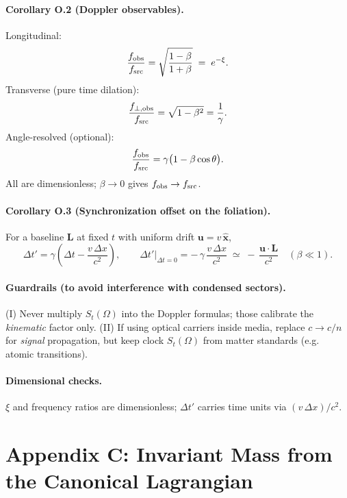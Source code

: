 \documentclass[11pt]{article}
\begin{document}
		\paragraph{Corollary O.2 (Doppler observables).}
		Longitudinal:
		\[
			\frac{f_{\rm obs}}{f_{\rm src}}=\sqrt{\frac{1-\beta}{1+\beta}} \;=\; e^{-\xi}.
		\]
		Transverse (pure time dilation):
		\[
			\frac{f_{\perp,{\rm obs}}}{f_{\rm src}}=\sqrt{1-\beta^2}=\frac{1}{\gamma}.
		\]
		Angle-resolved (optional):
		\[
			\frac{f_{\rm obs}}{f_{\rm src}}=\gamma\bigl(1-\beta\cos\theta\bigr).
		\]
		All are dimensionless; $\beta\to 0$ gives $f_{\rm obs}\to f_{\rm src}$.

		\paragraph{Corollary O.3 (Synchronization offset on the foliation).}
		For a baseline $\mathbf L$ at fixed $t$ with uniform drift $\mathbf u = v\,\hat{\mathbf x}$,
		\[
			\Delta t'=\gamma\!\left(\Delta t-\frac{v\,\Delta x}{c^2}\right),
			\qquad
			\Delta t'\big|_{\Delta t=0}=-\,\gamma\,\frac{v\,\Delta x}{c^2}
			\;\simeq\; -\,\frac{\mathbf u\!\cdot\!\mathbf L}{c^2}\quad (\beta\ll 1).
		\]

		\paragraph{Guardrails (to avoid interference with condensed sectors).}
		(I) Never multiply $S_t(\Omega)$ into the Doppler formulas; those calibrate the \emph{kinematic} factor only.
		(II) If using optical carriers inside media, replace $c\!\to\! c/n$ for \emph{signal} propagation, but keep clock $S_t(\Omega)$ from matter standards (e.g. atomic transitions).

		\paragraph{Dimensional checks.}
		$\xi$ and frequency ratios are dimensionless; $\Delta t'$ carries time units via $(v\,\Delta x)/c^2$.




\section*{Appendix C: Invariant Mass from the Canonical Lagrangian}
\end{document}
